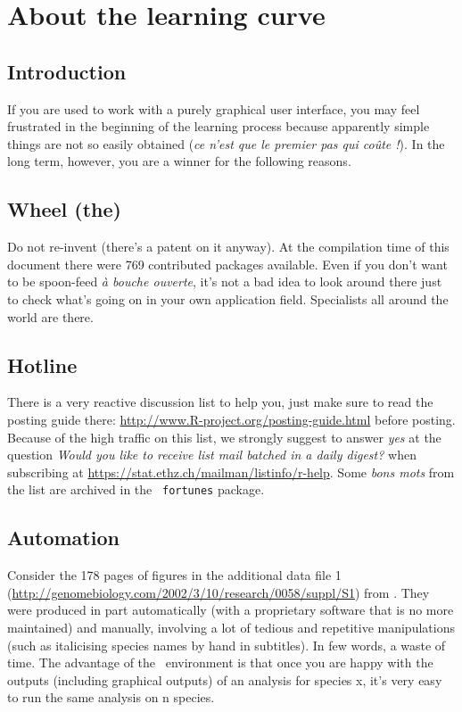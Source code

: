 \documentclass{article}
\begin{document}
\section{About the learning curve}

\subsection*{Introduction}

If you are used to work with a purely graphical user interface, you may feel frustrated in the
beginning of the learning process because apparently simple things are not so easily
obtained (\textit{ce n'est que le premier pas qui co{\^{u}te} !}).
In the long term, however, you are a winner for the following reasons.

\subsection{Wheel (the)}

Do not re-invent (there's a patent \cite{wheel} on it anyway).
At the compilation time of this document there were 
769
contributed packages available. Even if you don't want to be spoon-feed 
\textit{{\`a} bouche ouverte}, 
it's not a bad
idea to look around there just to check what's going on in your own application field.
Specialists all around the world are there.

\subsection{Hotline}

There is a very reactive discussion list to help you, just make sure to
read the posting guide there: \url{http://www.R-project.org/posting-guide.html}
before posting. Because of the high traffic on this list, we strongly suggest to answer \emph{yes} at the
question \emph{Would you like to receive list mail batched in a daily  digest?} when
subscribing at \url{https://stat.ethz.ch/mailman/listinfo/r-help}. Some \textit{bons mots}
from the list are archived in the \Rlogo{}~\texttt{fortunes} package.

\subsection{Automation} 
Consider the 178 pages of figures in the additional data file 1
(\url{http://genomebiology.com/2002/3/10/research/0058/suppl/S1}) from \cite{lobrysueoka}. 
They were produced in part automatically (with a proprietary
software that is no more maintained) and manually, involving a lot of
tedious and repetitive manipulations (such as italicising species names by hand in subtitles).
In few words, a waste of time. The advantage of the \Rlogo{}~environment is that once you are
happy with the outputs (including graphical outputs) of an analysis for species x, it's very
easy to run the same analysis on n species. 
\end{document}

